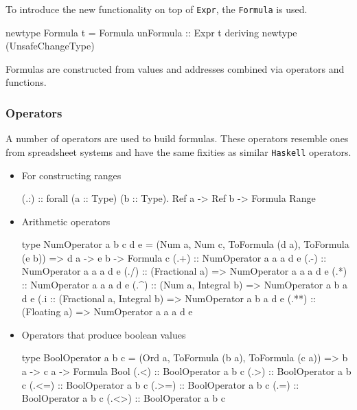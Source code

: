 To introduce the new functionality on top of \texttt{Expr}, the \texttt{Formula} is used.

\begin{mycode}
  newtype Formula t = Formula {unFormula :: Expr t}
  deriving newtype (UnsafeChangeType)
\end{mycode}

Formulas are constructed from values and addresses combined via operators and functions.

\subsubsection{Operators}
\label{sec:operators}

A number of operators are used to build formulas.
These operators resemble ones from spreadsheet systems and have the same fixities as similar \texttt{Haskell} operators.

\begin{itemize}
  \item For constructing ranges
        \begin{mycode}
          (.:) :: forall (a :: Type) (b :: Type). Ref a -> Ref b -> Formula Range
        \end{mycode}
  \item Arithmetic operators
        \begin{mycode}
          type NumOperator a b c d e = (Num a, Num c, ToFormula (d a), ToFormula (e b)) => d a -> e b -> Formula c
          (.+) :: NumOperator a a a d e
          (.-) :: NumOperator a a a d e
          (./) :: (Fractional a) => NumOperator a a a d e
          (.*) :: NumOperator a a a d e
          (.^) :: (Num a, Integral b) => NumOperator a b a d e
          (.^^) :: (Fractional a, Integral b) => NumOperator a b a d e
          (.**) :: (Floating a) => NumOperator a a a d e
        \end{mycode}
  \item Operators that produce boolean values
        \begin{mycode}
          type BoolOperator a b c = (Ord a, ToFormula (b a), ToFormula (c a)) => b a -> c a -> Formula Bool
          (.<) :: BoolOperator a b c
          (.>) :: BoolOperator a b c
          (.<=) :: BoolOperator a b c
          (.>=) :: BoolOperator a b c
          (.=) :: BoolOperator a b c
          (.<>) :: BoolOperator a b c
        \end{mycode}
\end{itemize}

